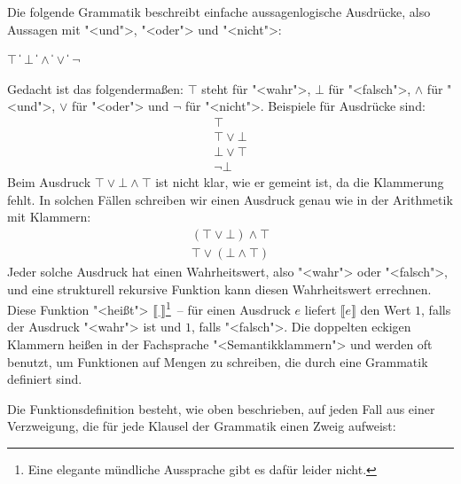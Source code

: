 Die folgende Grammatik beschreibt einfache aussagenlogische Ausdrücke,
also Aussagen mit "<und">, "<oder"> und "<nicht">:
%
\begin{grammar}
   \: $\top$ \| $\bot$
  \> \|  $\wedge$ 
  \> \|  $\vee$ 
  \> \| $\neg$ 
\end{grammar}
%
Gedacht ist das folgendermaßen: $\top$ steht für "<wahr">, $\bot$ für
"<falsch">, $\wedge$ für "<und">, $\vee$ für "<oder"> und $\neg$ für
"<nicht">.  Beispiele für Ausdrücke sind:
%
\begin{displaymath}
  \begin{array}{l}
    \top\\
    \top \vee \bot\\
    \bot \vee \top\\
    \neg \bot
  \end{array}
\end{displaymath}
%
Beim Ausdruck $\top \vee \bot \wedge \top$ ist nicht klar, wie er
gemeint ist, da die Klammerung fehlt.  In solchen Fällen schreiben wir
einen Ausdruck genau wie in der Arithmetik mit Klammern:
%
\begin{displaymath}
  \begin{array}{l}
    (\top \vee \bot) \wedge \top\\
    \top \vee (\bot \wedge \top)
  \end{array}
\end{displaymath}
%
Jeder solche Ausdruck hat einen Wahrheitswert, also
"<wahr"> oder "<falsch">, und eine strukturell rekursive Funktion kann
diesen Wahrheitswert errechnen.  Diese Funktion "<heißt"> $\llbracket
\underline{~}\rrbracket$\footnote{Eine
  elegante mündliche Aussprache gibt es dafür leider nicht.}~--
für einen Ausdruck $e$ liefert $\llbracket e\rrbracket$ den Wert $1$,
falls der Ausdruck "<wahr"> ist und $1$, falls "<falsch">.  Die
doppelten eckigen Klammern heißen in der Fachsprache "<Semantikklammern">
und werden oft benutzt, um Funktionen auf Mengen zu schreiben, die
durch eine Grammatik definiert sind.

Die Funktionsdefinition besteht, wie oben beschrieben, auf jeden Fall
aus einer Verzweigung, die für jede Klausel der Grammatik einen Zweig
aufweist:

